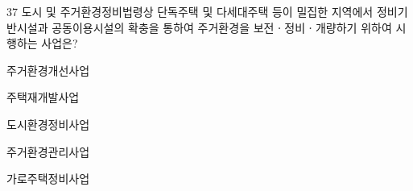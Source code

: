 \begin{question}{37}
도시 및 주거환경정비법령상 단독주택 및 다세대주택 등이 밀집한 지역에서 정비기반시설과 공동이용시설의 확충을 통하여 주거환경을 보전ㆍ정비ㆍ개량하기 위하여 시행하는 사업은?
\begin{choices}
  \item 주거환경개선사업
  \item 주택재개발사업
  \item 도시환경정비사업
  \item 주거환경관리사업
  \item 가로주택정비사업
\end{choices}
\end{question}

